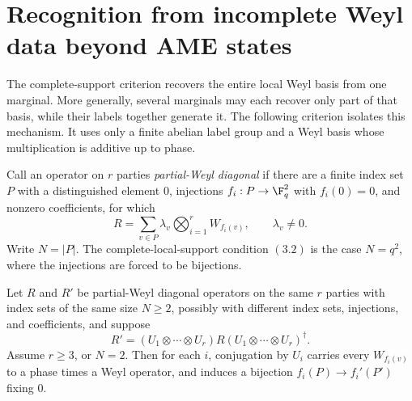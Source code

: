 \section{Recognition from incomplete Weyl data beyond AME states}
\label{subsec:recognition}

The complete-support criterion recovers the entire local Weyl basis from one
marginal.  More generally, several marginals may each recover only part of
that basis, while their labels together generate it.  The following
criterion isolates this mechanism.  It uses only a finite abelian label
group and a Weyl basis whose multiplication is additive up to phase.

Call an operator on \(r\) parties \emph{partial-Weyl diagonal} if there are
a finite index set \(P\) with a distinguished element \(0\), injections
\(f_i:P\to\F_q^2\) with \(f_i(0)=0\), and nonzero coefficients, for which
\[
 R=\sum_{v\in P}\lambda_v\bigotimes_{i=1}^{r}W_{f_i(v)},
 \qquad \lambda_v\ne0.
\]
Write \(N=|P|\).  The complete-local-support condition \((3.2)\) is the case
\(N=q^2\), where the injections are forced to be bijections.

\begin{proposition}
\label{prop:partial-weyl-marginal}
Let \(R\) and \(R'\) be partial-Weyl diagonal operators on the same
\(r\) parties with index sets of the same size \(N\geq2\), possibly with
different index sets, injections, and coefficients, and suppose
\[
 R'=(U_1\otimes\cdots\otimes U_r)R(U_1\otimes\cdots\otimes U_r)^\dagger .
\]
Assume \(r\geq3\), or \(N=2\).  Then for each \(i\), conjugation by
\(U_i\) carries every \(W_{f_i(v)}\) to a phase times a Weyl operator, and
induces a bijection \(f_i(P)\to f_i'(P')\) fixing \(0\).
\end{proposition}

